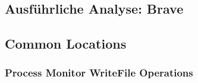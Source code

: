 \begin{appendices}

\pagebreak

\section{Ausführliche Analyse: Brave}\label{chap:anhang-brave}
\subsection{Common Locations}\label{chap:anhang-brave-common-locations}
\subsubsection*{Process Monitor WriteFile Operations}\label{chap:anhang-brave-common-locations-writefile-operations}


\end{appendices}
